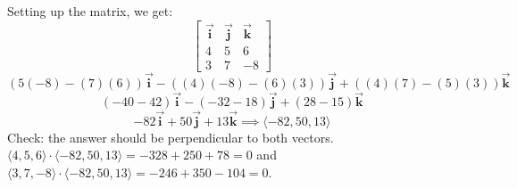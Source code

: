 \begin{Answer}[ref = cross1]
Setting up the matrix, we get:
\[\begin{bmatrix}
    \vec{\mathbf{i}} & \vec{\mathbf{j}} & \vec{\mathbf{k}} \\ 
    4 & 5 & 6 \\ 
    3 & 7 & -8 
\end{bmatrix}
\]
\[\left(5(-8) - (7)(6)\right)\vec{\mathbf{i}} - ((4)(-8) - (6)(3))\vec{\mathbf{j}} + ((4)(7)-(5)(3))\vec{\mathbf{k}}
\]
\[
(-40 - 42 ) \vec{\mathbf{i}} - (-32 - 18)\vec{\mathbf{j}} + (28 - 15) \vec{\mathbf{k}}
\]
\[
-82 \vec{\mathbf{i}} +50\vec{\mathbf{j}} + 13 \vec{\mathbf{k}} \implies \langle-82, 50, 13\rangle
\]
Check: the answer should be perpendicular to both vectors.
$\langle 4, 5, 6\rangle \cdot \langle -82, 50, 13\rangle = -328 + 250 + 78 = 0$ and
$\langle 3, 7, -8\rangle \cdot \langle -82, 50, 13\rangle = -246 + 350 - 104 = 0$.
\end{Answer}
